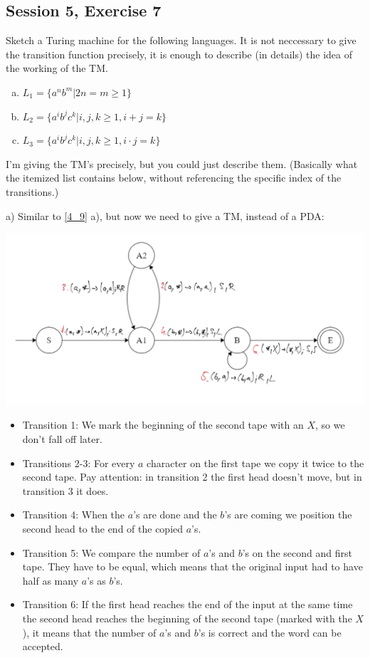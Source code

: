 \subsection {Session 5, Exercise 7}


Sketch a Turing machine for the following languages. It is not neccessary to give the transition function precisely, it is enough to describe (in details) the idea of the working of the TM.

\begin{enumerate}[a)]
    \item $L_1 = \{a^nb^m | 2n = m \geq{} 1\}$
    \item $L_2 = \{a^ib^jc^k | i,j,k \geq{} 1, i+j = k\}$
    \item $L_3 = \{a^ib^jc^k | i,j,k \geq{} 1, i \cdot j = k\}$
\end{enumerate}


I'm giving the TM's precisely, but you could just describe them. (Basically what the itemized list contains below, without referencing the specific index of the transitions.)

a) Similar to \ref{4_9} a), but now we need to give a TM, instead of a PDA:

\includegraphics[width=\linewidth]{05/6_7_canvas.png}

\begin{itemize}
    \item Transition 1: We mark the beginning of the second tape with an $X$, so we don't fall off later.
    \item Transitions 2-3: For every $a$ character on the first tape we copy it twice to the second tape. Pay attention: in transition 2 the first head doesn't move, but in transition 3 it does.
    \item Transition 4: When the $a$'s are done and the $b$'s are coming we position the second head to the end of the copied $a$'s.
    \item Transition 5: We compare the number of $a$'s and $b$'s on the second and first tape. They have to be equal, which means that the original input had to have half as many $a$'s as $b$'s.
    \item Transition 6: If the first head reaches the end of the input at the same time the second head reaches the beginning of the second tape (marked with the $X$), it means that the number of $a$'s and $b$'s is correct and the word can be accepted.
\end{itemize}

